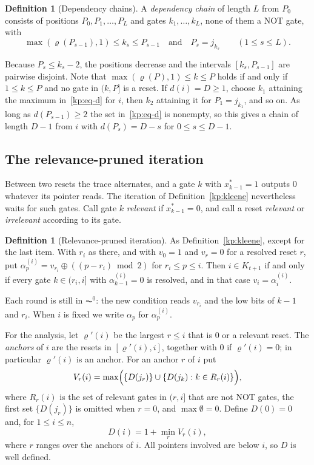 \documentclass[11pt]{amsart}
\theoremstyle{definition}
\newtheorem{definition}[theorem]{Definition}
\theoremstyle{remark}
\begin{document}
\begin{definition}[Dependency chains]\label{kp:chain}
A \emph{dependency chain} of length $L$ from $P_0$ consists of positions
$P_0,P_1,\dots,P_L$ and gates $k_1,\dots,k_L$, none of them a NOT gate, with
\[
  \max(\varrho(P_{s-1}),1)\le k_s\le P_{s-1}
  \quad\text{and}\quad P_s=j_{k_s}\qquad(1\le s\le L).
\]
\end{definition}

Because $P_s\le k_s-2$, the positions decrease and the intervals
$[k_s,P_{s-1}]$ are pairwise disjoint. Note that
$\max(\varrho(P),1)\le k\le P$ holds if and only if $1\le k\le P$ and no gate in
$(k,P]$ is a reset. If $d(i)=D\ge 1$, choose $k_1$ attaining the maximum
in~\eqref{kp:eq-d} for $i$, then $k_2$ attaining it for $P_1=j_{k_1}$, and so
on. As long as $d(P_{s-1})\ge 2$ the set in~\eqref{kp:eq-d} is nonempty, so this
gives a chain of length $D-1$ from $i$ with $d(P_s)=D-s$ for $0\le s\le D-1$.

\subsection{The relevance-pruned iteration}\label{kp:sub-pruned}

Between two resets the trace alternates, and a gate $k$ with $x^*_{k-1}=1$
outputs $0$ whatever its pointer reads. The iteration of
Definition~\ref{kp:kleene} nevertheless waits for such gates. Call gate $k$
\emph{relevant} if $x^*_{k-1}=0$, and call a reset \emph{relevant} or
\emph{irrelevant} according to its gate.

\begin{definition}[Relevance-pruned iteration]\label{kp:pruned-def}
As Definition~\ref{kp:kleene}, except for the last item. With $r_i$ as there,
and with $v_0=1$ and $v_r=0$ for a resolved reset $r$, put
$\alpha^{(i)}_p=v_{r_i}\oplus((p-r_i)\bmod 2)$ for $r_i\le p\le i$. Then
$i\in K_{t+1}$ if and only if every gate $k\in(r_i,i]$ with
$\alpha^{(i)}_{k-1}=0$ is resolved, and in that case $v_i=\alpha^{(i)}_i$.
\end{definition}

Each round is still in $\AC^0$: the new condition reads $v_{r_i}$ and the low
bits of $k-1$ and $r_i$. When $i$ is fixed we write $\alpha_p$ for
$\alpha^{(i)}_p$.

For the analysis, let $\varrho'(i)$ be the largest $r\le i$ that is $0$ or a
relevant reset. The \emph{anchors} of $i$ are the resets in $[\varrho'(i),i]$,
together with $0$ if $\varrho'(i)=0$; in particular $\varrho'(i)$ is an anchor.
For an anchor $r$ of $i$ put
\begin{equation}\label{kp:eq-V}
  V_r(i)=\max\Bigl(\{D(j_r)\}\cup\{D(j_k): k\in R_r(i)\}\Bigr),
\end{equation}
where $R_r(i)$ is the set of relevant gates in $(r,i]$ that are not NOT gates,
the first set $\{D(j_r)\}$ is omitted when $r=0$, and $\max\emptyset=0$. Define
$D(0)=0$ and, for $1\le i\le n$,
\begin{equation}\label{kp:eq-D}
  D(i)=1+\min_{r}V_r(i),
\end{equation}
where $r$ ranges over the anchors of $i$. All pointers involved are below $i$,
so $D$ is well defined.
\end{document}

